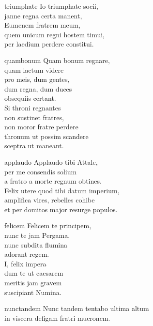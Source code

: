 \documentclass[tocstyle=ref-genre]{ees}
\begin{document}
{\begin{movement}{triumphate}
  \voice[Alto]
  Io triumphate socii,\\
  janne regna certa manent,\\
  Eumenem fratrem meum,\\
  quem unicum regni hostem timui,\\
  per laedium perdere constitui.
\end{movement}

\begin{movement}{quambonum}
  \voice[Alto]
  Quam bonum regnare,\\
  quam laetum videre\\
  pro meis, dum gentes,\\
  dum regna, dum duces\\
  obsequiis certant.\\[1ex]
  Si throni regnantes\\
  non sustinet fratres,\\
  non moror fratre perdere\\
  thronum ut possim scandere\\
  sceptra ut maneant.
\end{movement}

\begin{movement}{applaudo}
  \voice[Basso]
  Applaudo tibi Attale,\\
  per me consendis solium\\
  a fratro a morte regnum obtines.\\
  Felix utere quod tibi datum imperium,\\
  amplifica vires, rebelles cohibe\\
  et per domitos major resurge populos.
\end{movement}

\begin{movement}{felicem}
  \voice[Basso]
  Felicem te principem,\\
  nunc te jam Pergama,\\
  nunc subdita flumina\\
  adorant regem.\\[1ex]
  I, felix impera\\
  dum te ut caesarem\\
  meritis jam gravem\\
  suscipiant Numina.
\end{movement}

\begin{movement}{nunctandem}
  \voice[Alto]
  Nunc tandem tentabo ultima altum\\
  in viscera defigam fratri mueronem.


\end{movement}}
\end{document}
